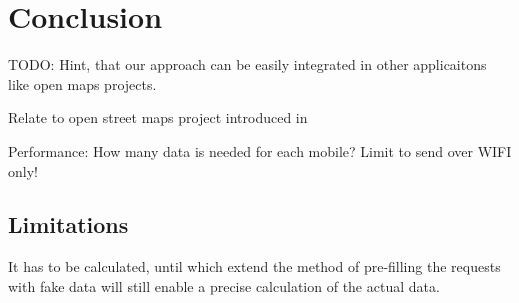 \chapter{Conclusion}\label{chapter:conclusion}

TODO: Hint, that our approach can be easily integrated in other applicaitons like open maps projects.

Relate to open street maps project introduced in \parencite{krumm}

Performance: How many data is needed for each mobile?
Limit to send over WIFI only!

\section{Limitations}
It has to be calculated, until which extend the method of pre-filling the requests with fake data will still enable a precise calculation of the actual data.
